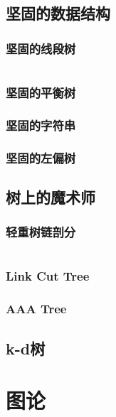 \documentclass[a4paper]{article}
\newcommand{\cppcode}[1]{
    \inputminted[mathescape]{cpp}{source/#1}
}
\begin{document}
\subsection{坚固的数据结构}

\subsubsection{坚固的线段树}

\cppcode{data-structure/persistent-segment-tree.cpp}

\subsubsection{坚固的平衡树}


\subsubsection{坚固的字符串}

\subsubsection{坚固的左偏树}

\subsection{树上的魔术师}

\subsubsection{轻重树链剖分}

\cppcode{data-structure/heavy-light-decomposition.cpp}

\subsubsection{Link Cut Tree}

\subsubsection{AAA Tree}

\subsection{k-d树}

\section{图论}
\end{document}
